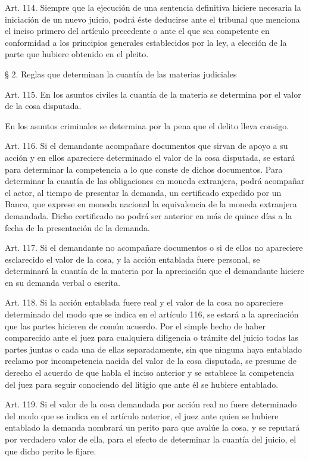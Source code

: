     Art. 114. Siempre que la ejecución de una sentencia definitiva hiciere necesaria la iniciación de un nuevo juicio, podrá éste deducirse ante el tribunal que menciona el inciso primero del artículo precedente o ante el que sea competente en conformidad a los principios generales establecidos por la ley, a elección de la parte que hubiere obtenido en el pleito.

    § 2. Reglas que determinan la cuantía de las materias judiciales


    Art. 115. En los asuntos civiles la cuantía de la materia se determina por el valor de la cosa disputada.

    En los asuntos criminales se determina por la pena que el delito lleva consigo.


    Art. 116. Si el demandante acompañare documentos que sirvan de apoyo a su acción y en ellos apareciere determinado el valor de la cosa disputada, se estará para determinar la competencia a lo que conste de dichos documentos.
    Para determinar la cuantía de las obligaciones en moneda extranjera, podrá acompañar el actor, al tiempo de presentar la demanda, un certificado expedido por un Banco, que exprese en moneda nacional la equivalencia de la moneda extranjera demandada. Dicho certificado no podrá ser anterior en más de quince días a la fecha de la presentación de la demanda.


    Art. 117. Si el demandante no acompañare documentos o si de ellos no apareciere esclarecido el valor de la cosa, y la acción entablada fuere personal, se determinará la cuantía de la materia por la apreciación que el demandante hiciere en su demanda verbal o escrita.

    Art. 118. Si la acción entablada fuere real y el valor de la cosa no apareciere determinado del modo que se indica en el artículo 116, se estará a la apreciación que las partes hicieren de común acuerdo.
    Por el simple hecho de haber comparecido ante el juez para cualquiera diligencia o trámite del juicio todas las partes juntas o cada una de ellas separadamente, sin que ninguna haya entablado reclamo por incompetencia nacida del valor de la cosa disputada, se presume de derecho el acuerdo de que habla el inciso anterior y se establece la competencia del juez para seguir conociendo del litigio que ante él se hubiere entablado.



    Art. 119. Si el valor de la cosa demandada por acción real no fuere determinado del modo que se indica en el artículo anterior, el juez ante quien se hubiere entablado la demanda nombrará un perito para que avalúe la cosa, y se reputará por verdadero valor de ella, para el efecto de determinar la cuantía del juicio, el que dicho perito le fijare.



